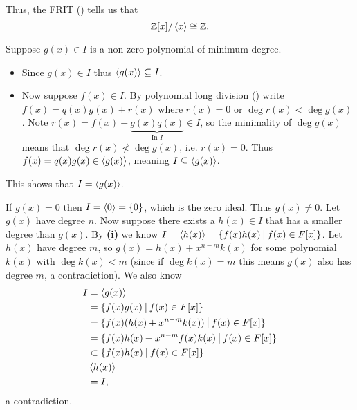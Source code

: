 \begin{questions}
    Thus, the FRIT () tells us that
    \[
        \mathbb{Z}[x] / \left\langle x\right\rangle \cong \mathbb{Z}.
    \]

    \item %

    \item \begin{partquestions}{\roman*}
        \item Suppose $g(x) \in I$ is a non-zero polynomial of minimum degree.
        \begin{itemize}
            \item Since $g(x) \in I$ thus $\left\langle g(x)\right\rangle \subseteq I$.
            \item Now suppose $f(x) \in I$. By polynomial long division () write $f(x) = q(x)g(x) + r(x)$ where $r(x) = 0$ or $\deg r(x) < \deg g(x)$. Note $r(x) = f(x) - \underbrace{g(x)q(x)}_{\text{In }I} \in I$, so the minimality of $\deg g(x)$ means that $\deg r(x) \not< \deg g(x)$, i.e. $r(x) = 0$. Thus $f(x) = q(x)g(x) \in \left\langle g(x)\right\rangle$, meaning $I \subseteq \left\langle g(x)\right\rangle$.
        \end{itemize}
        This shows that $I = \left\langle g(x)\right\rangle$.

        \item If $g(x) = 0$ then $I = \left\langle0\right\rangle = \{0\}$, which is the zero ideal. Thus $g(x) \neq 0$. Let $g(x)$ have degree $n$. Now suppose there exists a $h(x) \in I$ that has a smaller degree than $g(x)$. By \textbf{(i)} we know $I = \princ{h(x)} = \{f(x)h(x) \vert f(x) \in F[x]\}$. Let $h(x)$ have degree $m$, so $g(x) = h(x) + x^{n-m}k(x)$ for some polynomial $k(x)$ with $\deg k(x) < m$ (since if $\deg k(x) = m$ this means $g(x)$ also has degree $m$, a contradiction). We also know
        \begin{align*}
            I &= \princ{g(x)}\\
            &= \{f(x)g(x) \vert f(x) \in F[x]\}\\
            &= \{f(x)(h(x) + x^{n-m}k(x)) \vert f(x) \in F[x]\}\\
            &= \{f(x)h(x) + x^{n-m}f(x)k(x) \vert f(x) \in F[x]\}\\
            &\subset \{f(x)h(x) \vert f(x) \in F[x]\}\\
            & \princ{h(x)}\\
            &= I,
        \end{align*}
        a contradiction.
    \end{partquestions}
    
    \item %
    
    \item %
    
    \item %
\end{questions}
